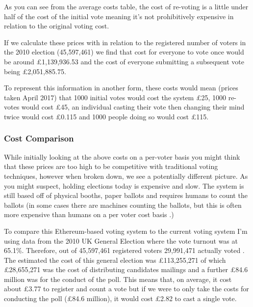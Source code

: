 \documentclass{article}
\begin{document}
	As you can see from the average costs table, the cost of re-voting is a little under half of the cost of the initial vote meaning it's not prohibitively expensive in relation to the original voting cost.
	
	If we calculate these prices with in relation to the registered number of voters in the 2010 election (45,597,461) \citep{69_statistics_from_2010_election} we find that cost for everyone to vote once would be around \pounds1,139,936.53 and the cost of everyone submitting a subsequent vote being \pounds2,051,885.75. 
	
	To represent this information in another form, these costs would mean (prices taken April 2017) that 1000 initial votes would cost the system \pounds25, 1000 re-votes would cost \pounds45, an individual casting their vote then changing their mind twice would cost \pounds0.115 and 1000 people doing so would cost \pounds115.

	\subsubsection{Cost Comparison}

	While initially looking at the above costs on a per-voter basis you might think that these prices are too high to be competitive with traditional voting techniques, however when broken down, we see a potentially different picture. As you might suspect, holding elections today is expensive and slow. The system is still based off of physical booths, paper ballots and requires humans to count the ballots (in some cases there are machines counting the ballots, but this is often more expensive than humans on a per voter cost basis \citep{71_arthur_2017}.)

	To compare this Ethereum-based voting system to the current voting system I'm using data from the 2010 UK General Election where the vote turnout was at 65.1\%. Therefore, out of 45,597,461 registered voters 29,991,471 actually voted \citep{72_voter_turnout_at_uk_general_elections}. The estimated the cost of this general election was \pounds113,255,271 \citep{70_what_price_democracy_counting_the_cost_of_uk_elections}  of which \pounds28,655,271 was the cost of distributing candidates mailings and a further \pounds84.6 million was for the conduct of the poll. This means that, on average, it cost about \pounds3.77 to register and count a vote but if we were to only take the costs for conducting the poll (\pounds84.6 million), it would cost \pounds2.82 to cast a single vote.
\end{document}
